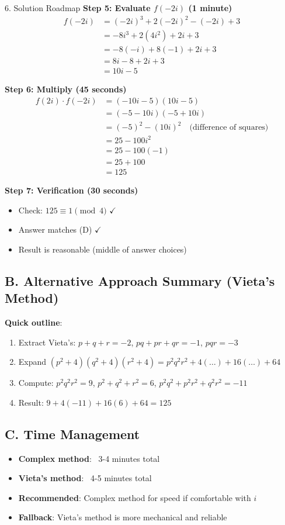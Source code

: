 \documentclass[12pt]{article}
\begin{document}
\begin{roadmapbox}{6. Solution Roadmap}
\textbf{Step 5: Evaluate $f(-2i)$ (1 minute)}
\begin{align*}
f(-2i) &= (-2i)^3 + 2(-2i)^2 - (-2i) + 3\\
&= -8i^3 + 2(4i^2) + 2i + 3\\
&= -8(-i) + 8(-1) + 2i + 3\\
&= 8i - 8 + 2i + 3\\
&= 10i - 5
\end{align*}

\textbf{Step 6: Multiply (45 seconds)}
\begin{align*}
f(2i) \cdot f(-2i) &= (-10i - 5)(10i - 5)\\
&= (-5 - 10i)(-5 + 10i)\\
&= (-5)^2 - (10i)^2 \quad \text{(difference of squares)}\\
&= 25 - 100i^2\\
&= 25 - 100(-1)\\
&= 25 + 100\\
&= 125
\end{align*}

\textbf{Step 7: Verification (30 seconds)}
\begin{itemize}
    \item Check: $125 \equiv 1 \pmod{4}$ $\checkmark$
    \item Answer matches (D) $\checkmark$
    \item Result is reasonable (middle of answer choices)
\end{itemize}

\subsection*{B. Alternative Approach Summary (Vieta's Method)}

\textbf{Quick outline}:
\begin{enumerate}
    \item Extract Vieta's: $p + q + r = -2$, $pq + pr + qr = -1$, $pqr = -3$
    \item Expand $(p^2 + 4)(q^2 + 4)(r^2 + 4) = p^2q^2r^2 + 4(\ldots) + 16(\ldots) + 64$
    \item Compute: $p^2q^2r^2 = 9$, $p^2 + q^2 + r^2 = 6$, $p^2q^2 + p^2r^2 + q^2r^2 = -11$
    \item Result: $9 + 4(-11) + 16(6) + 64 = 125$
\end{enumerate}

\subsection*{C. Time Management}
\begin{itemize}[leftmargin=*]
    \item \textbf{Complex method}: ~3-4 minutes total
    \item \textbf{Vieta's method}: ~4-5 minutes total
    \item \textbf{Recommended}: Complex method for speed if comfortable with $i$
    \item \textbf{Fallback}: Vieta's method is more mechanical and reliable
\end{itemize}


\end{roadmapbox}
\end{document}
